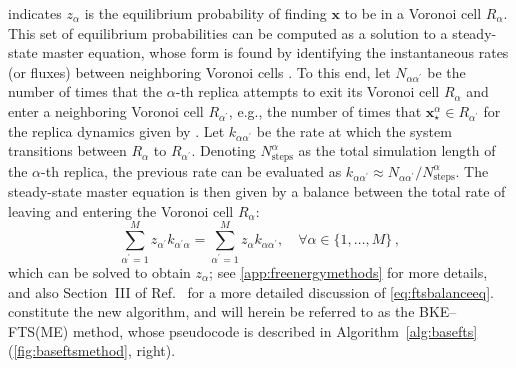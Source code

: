\documentclass{article}
\numberwithin{equation}{section}
\def\*#1{\mathbf{#1}}
\theoremstyle{definition}
\theoremstyle{remark}
\begin{document}
 indicates $z_\alpha$ is the equilibrium probability of finding $\* x$ to be in a Voronoi cell $R_\alpha$. 
This set of equilibrium probabilities can be computed as a solution to a steady-state master equation, whose form is found by identifying the instantaneous rates (or fluxes) between neighboring Voronoi cells \cite{vanden2009revisiting}. 
To this end, let $N_{\alpha \alpha^\prime}$ be the number of times that the $\alpha$-th replica attempts to exit its Voronoi cell $R_{\alpha}$ and enter a neighboring Voronoi cell $R_{\alpha^\prime}$, e.g., the number of times that $\* x_\star^\alpha \in R_{\alpha^\prime}$ for the replica dynamics given by . 
Let $k_{\alpha \alpha^\prime}$ be the rate at which the system transitions between $ R_\alpha $ to $ R_{\alpha^\prime} $. 
Denoting $N_\mathrm{steps}^\alpha$ as the total simulation length of the $\alpha$-th replica, the previous rate can be evaluated as $k_{\alpha \alpha^\prime} \approx N_{\alpha \alpha^\prime}/N_\mathrm{steps}^\alpha$. 
The steady-state master equation is then given by a balance between the total rate of leaving and entering the Voronoi cell $R_\alpha$:
\begin{equation}
    \sum_{\alpha^\prime=1}^M z_{\alpha^\prime} k_{\alpha^\prime \alpha} = \sum_{\alpha^\prime=1}^M z_{\alpha} k_{\alpha \alpha^\prime }, \quad \forall \alpha \in \{1,\ldots,M\} \,, \label{eq:ftsbalanceeq} 
\end{equation}
which can be solved to obtain $z_\alpha$; see \cref{app:freenergymethods} for more details, 
and also Section~III of Ref.~\cite{vanden2009markovian} for a more detailed discussion of \cref{eq:ftsbalanceeq}. 
 constitute the new algorithm, and will herein be referred to as the BKE--FTS(ME) method, whose 
pseudocode is described in Algorithm~\ref{alg:basefts} (\cref{fig:baseftsmethod}, right). 
\end{document}
